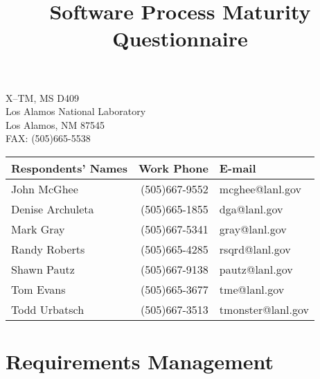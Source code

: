 \documentclass{questionnaire}
\title{Software Process Maturity Questionnaire}
\begin{document}
\maketitle
\begin{center}
\parbox{35ex}{X--TM, MS D409\\
Los Alamos National Laboratory\\
Los Alamos, NM 87545\\
FAX: (505)665-5538\\}

\begin{tabular}{|l|r|l|} \hline
{\bf Respondents' Names} & {\bf Work Phone} & {\bf E-mail} \\ \hline
John McGhee              & (505)667-9552    & mcghee@lanl.gov \\
Denise Archuleta         & (505)665-1855    & dga@lanl.gov \\
Mark Gray                & (505)667-5341    & gray@lanl.gov \\
Randy Roberts            & (505)665-4285    & rsqrd@lanl.gov \\
Shawn Pautz              & (505)667-9138    & pautz@lanl.gov \\
Tom Evans                & (505)665-3677    & tme@lanl.gov \\
Todd Urbatsch            & (505)667-3513    & tmonster@lanl.gov \\ \hline
\end{tabular}
\end{center}

\newpage
\section{Requirements Management}

\begin{KPAActivity}
\end{KPAActivity}
\end{document}
